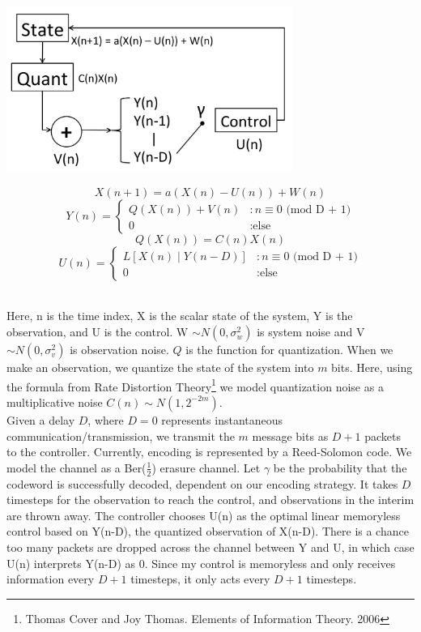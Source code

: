 \documentclass[10pt]{article}
\begin{document}
\begin{minipage}{0.4\textwidth}
\includegraphics[width=0.7\textwidth]{sys_dynamics_2} 
\end{minipage}
\begin{minipage}{0.5\textwidth}
\[ X(n+1) = a(X(n) - U(n)) + W(n) \]
\[ Y(n) = \left\{
     \begin{array}{ll}
       Q(X(n)) + V(n) & : n \equiv 0 \text{ (mod D + 1)}\\
       0 & : \text{else}
     \end{array}
   \right. \]
\[ Q(X(n)) = C(n)X(n) \]
\[ U(n) = \left\{
     \begin{array}{ll}
       L[X(n) \; | \; Y(n-D)] & : n \equiv 0 \text{ (mod  D + 1)}\\
       0 & : \text{else}
     \end{array}
   \right. \]
\end{minipage}\\

Here, n is the time index, X is the scalar state of the system, Y is the observation, and U is the control. W $\sim N(0,\sigma^2_w)$ is system noise and V $\sim N(0, \sigma^2_v)$ is observation noise. $Q$ is the function for quantization. When we make an observation, we quantize the state of the system into $m$ bits. Here, using the formula from Rate Distortion Theory\footnote{Thomas Cover and Joy Thomas. Elements of Information Theory. 2006} we model quantization noise as a multiplicative noise $C(n) \sim N(1, 2^{-2m})$.\\

Given a delay $D$, where $D = 0$ represents instantaneous communication/transmission, we transmit the $m$ message bits as $D+1$ packets to the controller. Currently, encoding is represented by a Reed-Solomon code. We model the channel as a Ber($\frac{1}{2}$) erasure channel. Let $\gamma$ be the probability that the codeword is successfully decoded, dependent on our encoding strategy. It takes $D$ timesteps for the observation to reach the control, and observations in the interim are thrown away. The controller chooses U(n) as the optimal linear memoryless control based on Y(n-D), the quantized observation of X(n-D). There is a chance too many packets are dropped across the channel between Y and U, in which case U(n) interprets Y(n-D) as 0. Since my control is memoryless and only receives information every $D+1$ timesteps, it only acts every $D+1$ timesteps.\\
\end{document}
